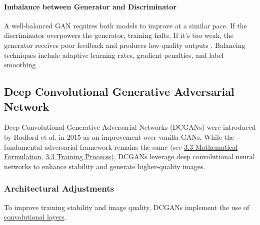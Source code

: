 \paragraph[Imbalance between Generator and Discriminator]{Imbalance between Generator and Discriminator}
A well-balanced GAN requires both models to improve at a similar pace. If the discriminator overpowers the generator, training halts. If it's too weak, the generator receives poor feedback and produces low-quality outputs \cite{goodfellow2014generativeadversarialnetworks}. Balancing techniques include adaptive learning rates, gradient penalties, and label smoothing \cite{Radford2015DCGAN}.


\subsection[Deep Convolutional Generative Adversarial Network - DCGAN]{Deep Convolutional Generative Adversarial Network}\label{theoretical_dcgan}
Deep Convolutional Generative Adversarial Networks (DCGANs) were introduced by Radford et al. in 2015 \cite{Radford2015DCGAN} as an improvement over vanilla GANs. While the fundamental adversarial framework remains the same (see \hyperref[theoretical_gan_math]{3.3 Mathematical Formulation}, \hyperref[theoretical_gan_training]{3.3 Training Procecss}), DCGANs leverage deep convolutional neural networks to enhance stability and generate higher-quality images.

\subsubsection{Architectural Adjustments}\label{theorey_dcgan_architecture}
To improve training stability and image quality, DCGANs implement the use of \hyperref[theoretical_classification_conv_layers]{convolutional layers}.

